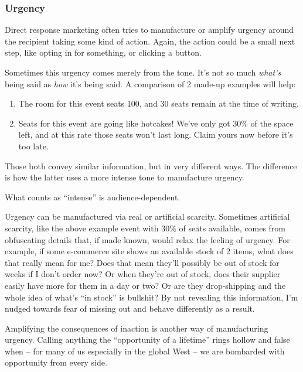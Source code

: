 \documentclass[13pt,]{tufte-handout}
\providecommand{\tightlist}{%
  \setlength{\itemsep}{0pt}\setlength{\parskip}{0pt}}
\begin{document}
\hypertarget{urgency}{%
\subsubsection{Urgency}\label{urgency}}

Direct response marketing often tries to manufacture or amplify urgency
around the recipient taking some kind of action. Again, the action could
be a small next step, like opting in for something, or clicking a
button.

Sometimes this urgency comes merely from the tone. It's not so much
\emph{what's} being said as \emph{how} it's being said. A comparison of
2 made-up examples will help:

\begin{enumerate}
\def\labelenumi{\arabic{enumi}.}
\tightlist
\item
  The room for this event seats 100, and 30 seats remain at the time of
  writing.
\item
  Seats for this event are going like hotcakes! We've only got 30\% of
  the space left, and at this rate those seats won't last long. Claim
  yours now before it's too late.
\end{enumerate}

Those both convey similar information, but in very different ways. The
difference is how the latter uses a more intense tone to manufacture
urgency.

What counts as ``intense'' is audience-dependent.

Urgency can be manufactured via real or artificial scarcity. Sometimes
artificial scarcity, like the above example event with 30\% of seats
available, comes from obfuscating details that, if made known, would
relax the feeling of urgency. For example, if some e-commerce site shows
an available stock of 2 items, what does that really mean for me? Does
that mean they'll possibly be out of stock for weeks if I don't order
now? Or when they're out of stock, does their supplier easily have more
for them in a day or two? Or are they drop-shipping and the whole idea
of what's ``in stock'' is bullshit? By not revealing this information,
I'm nudged towards fear of missing out and behave differently as a
result.

Amplifying the consequences of inaction is another way of manufacturing
urgency. Calling anything the ``opportunity of a lifetime'' rings hollow
and false when -- for many of us especially in the global West -- we are
bombarded with opportunity from every side.
\end{document}

